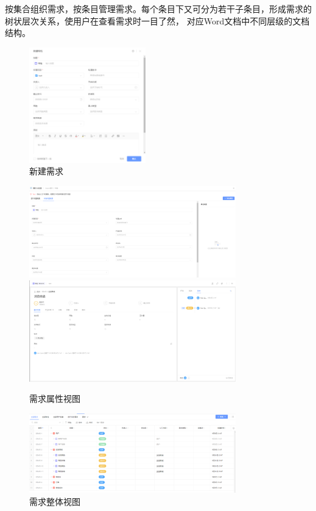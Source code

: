 \documentclass[12pt, a4paper, oneside]{ctexart}
\begin{document}
按集合组织需求，按条目管理需求。每个条目下又可分为若干子条目，形成需求的树状层次关系，使用户在查看需求时一目了然，
对应Word文档中不同层级的文档结构。
\begin{figure}[H]
    \centering
    \includegraphics[width=0.45\textwidth]{../pic/1/3.1.png}
    \caption{新建需求}
\end{figure}
\begin{figure}[H]
    \centering
    \includegraphics[width=0.8\textwidth]{../pic/1/3.2.png}
    \includegraphics[width=0.8\textwidth]{../pic/1/3.4.png}
    \caption{需求属性视图}
\end{figure}
\begin{figure}[H]
    \centering
    \includegraphics[width=0.8\textwidth]{../pic/1/3.3.png}
    \caption{需求整体视图}
\end{figure}
\end{document}
